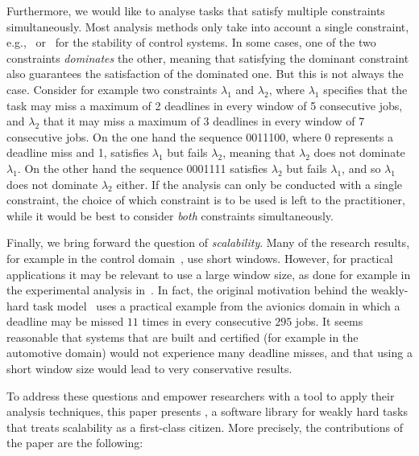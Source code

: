 Furthermore, we would like to analyse tasks that satisfy multiple constraints simultaneously.
Most analysis methods only take into account a single constraint, e.g.,~\cite{Pazzaglia:2018} or~\cite{Maggio:2020} for the stability of control systems.
In some cases, one of the two constraints \emph{dominates} the other, meaning that satisfying the dominant constraint also guarantees the satisfaction of the dominated one. 
But this is not always the case.
Consider for example two constraints $\lambda_1$ and $\lambda_2$, where $\lambda_1$ specifies that the task may miss a maximum of 2 deadlines in every window of 5 consecutive jobs, and $\lambda_2$ that it may miss a maximum of 3 deadlines in every window of 7 consecutive jobs.
On the one hand the sequence 0011100, where 0 represents a deadline miss and 1, satisfies $\lambda_1$ but fails $\lambda_2$, meaning that $\lambda_2$ does not dominate $\lambda_1$.
On the other hand the sequence 0001111 satisfies $\lambda_2$ but fails $\lambda_1$, and so $\lambda_1$ does not dominate $\lambda_2$ either.
If the analysis can only be conducted with a single constraint, the choice of which constraint is to be used is left to the practitioner, while it would be best to consider \emph{both} constraints simultaneously.

Finally, we bring forward the question of \emph{scalability}. 
Many of the research results, for example in the control domain~\cite{Pazzaglia:2018, Linsenmayer:2017, Linsenmayer:2021}, use short windows. 
However, for practical applications it may be relevant to use a large window size, as done for example in the experimental analysis in~\cite{Behrouzian:2020}. 
In fact, the original motivation behind the weakly-hard task model~\cite{Bernat:2001} uses a practical example from the avionics domain in which a deadline may be missed $11$ times in every consecutive $295$ jobs. 
It seems reasonable that systems that are built and certified (for example in the automotive domain) would not experience many deadline misses, and that using a short window size would lead to very conservative results.

To address these questions and empower researchers with a tool to apply their analysis techniques, this paper presents \tool, a software library for weakly hard tasks that treats scalability as a first-class citizen. 
More precisely, the contributions of the paper are the following:

